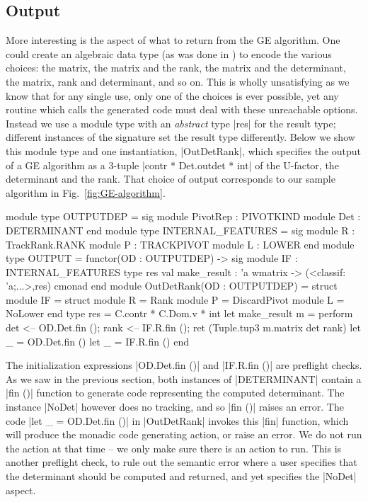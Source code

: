 \documentclass{elsart}
\begin{document}
\subsection{Output}

More interesting is the aspect of what to return from the GE
algorithm.  One could create an algebraic data type (as was done in
\cite{Carette06}) to encode the various choices: the matrix, the
matrix and the rank, the matrix and the determinant, the matrix, rank
and determinant, and so on. This is wholly unsatisfying as we know
that for any single use, only one of the choices is ever possible, yet
any routine which calls the generated code must deal with these
unreachable options.  Instead we use a module type with an
\emph{abstract} type |res| for the result type; different instances of
the signature set the result type differently. Below we show this
module type and one instantiation, |OutDetRank|, which specifies the
output of a GE algorithm as a $3$-tuple |contr * Det.outdet * int| of
the U-factor, the determinant and the rank. That choice of output
corresponds to our sample algorithm in Fig.~\ref{fig:GE-algorithm}.

\begin{code}
module type OUTPUTDEP = sig 
    module PivotRep : PIVOTKIND 
    module Det      : DETERMINANT
end
module type INTERNAL_FEATURES = sig
  module R      : TrackRank.RANK
  module P      : TRACKPIVOT
  module L      : LOWER
end
module type OUTPUT = functor(OD : OUTPUTDEP) -> sig
  module IF : INTERNAL_FEATURES
  type res
  val make_result : 'a wmatrix -> (<classif: 'a;...>,res) cmonad
end
module OutDetRank(OD : OUTPUTDEP) = struct
  module IF = struct
    module R   = Rank
    module P   = DiscardPivot
    module L   = NoLower end
  type res = C.contr * C.Dom.v * int
  let make_result m = perform
    det  <-- OD.Det.fin ();
    rank <-- IF.R.fin ();
    ret (Tuple.tup3 m.matrix det rank)
  let _ = OD.Det.fin ()
  let _ = IF.R.fin ()
end
\end{code}

The initialization expressions |OD.Det.fin ()| and |IF.R.fin ()| are
preflight checks. As we saw in the previous section, both
instances of |DETERMINANT| contain a |fin ()| function to generate
code representing the computed determinant. The instance |NoDet|
however does no tracking, and so |fin ()| raises an error. The code
|let _ = OD.Det.fin ()| in |OutDetRank| invokes this |fin| function,
which will produce the monadic code generating action, or raise an
error. We do not run the action at that time -- we only make sure
there is an action to run. This is another preflight check, to rule
out the semantic error where a user specifies that the determinant
should be computed and returned, and yet specifies the |NoDet| aspect.
\end{document}
